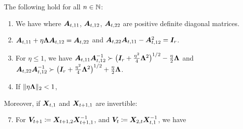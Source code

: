 \begin{lemma}
The following hold for all $n \in \mathbb{N}$:
\begin{enumerate}[label=(R.\arabic*), leftmargin=*]
\item \label{res:posdef} We have
where $\boldsymbol{A}_{t,11}$,  $\boldsymbol{A}_{t,12}$,  $\boldsymbol{A}_{t,22}$ are positive definite diagonal matrices.
\item \label{res:symdet} $\boldsymbol{A}_{t,11} + \eta \boldsymbol{\Lambda} \boldsymbol{A}_{t,12} = \boldsymbol{A}_{t,22}$ and $\boldsymbol{A}_{t,22} \boldsymbol{A}_{t,11} -  \boldsymbol{A}_{t,12}^2  = \boldsymbol{I}_r$.
\item  \label{res:ratiolb} For $\eta \leq 1$, we have  $\boldsymbol{A}_{t,11} \boldsymbol{A}_{t,12}^{-1} \succ \big( \boldsymbol{I}_r + \tfrac{\eta^2}{4} \boldsymbol{\Lambda}^2 \big)^{1/2} - \tfrac{\eta}{2}  \boldsymbol{\Lambda}$ and $\boldsymbol{A}_{t,22} \boldsymbol{A}_{t,12}^{-1} \succ \big( \boldsymbol{I}_r + \tfrac{\eta^2}{4} \boldsymbol{\Lambda}^2 \big)^{1/2} + \tfrac{\eta}{2}  \boldsymbol{\Lambda}$.
\item  \label{res:ratiobound} If $\lVert\eta \boldsymbol{\Lambda} \rVert_2 < 1$,  
\end{enumerate}
Moreover, if $\boldsymbol{X}_{t,1}$ and $\boldsymbol{X}_{t+1,1}$ are invertible:
\begin{enumerate}[label=(R.\arabic*), leftmargin=*]
\setcounter{enumi}{6}
\item  \label{res:update}  For $\boldsymbol{V}_{t+1} \coloneqq  \boldsymbol{X}_{t+1,2} \boldsymbol{X}_{t+1,1}^{-1}$, and $\boldsymbol{V}_t \coloneqq  \boldsymbol{X}_{2,t} \boldsymbol{X}_{t,1}^{-1}$, we have
\end{enumerate}
\end{lemma} 





